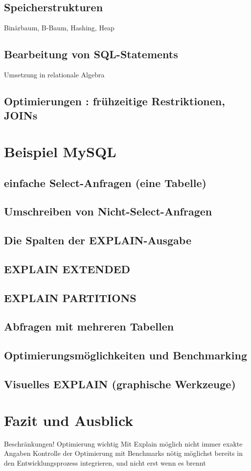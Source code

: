 \subsection{Speicherstrukturen}
 Binärbaum, B-Baum, Hashing, Heap
 
\subsection{Bearbeitung von SQL-Statements}
 Umsetzung in relationale Algebra
 
\subsection{Optimierungen : frühzeitige Restriktionen, JOINs}


\section{Beispiel MySQL}
\subsection{einfache Select-Anfragen (eine Tabelle)}
\subsection{Umschreiben von Nicht-Select-Anfragen}
\subsection{Die Spalten der EXPLAIN-Ausgabe}
\subsection{EXPLAIN EXTENDED}
\subsection{EXPLAIN PARTITIONS}
\subsection{Abfragen mit mehreren Tabellen}
\subsection{Optimierungsmöglichkeiten und Benchmarking}
\subsection{Visuelles EXPLAIN (graphische Werkzeuge)}

\section{Fazit und Ausblick}

Beschränkungen!
Optimierung wichtig
Mit Explain möglich
nicht immer exakte Angaben
Kontrolle der Optimierung mit Benchmarks nötig
möglichst bereits in den Entwicklungsprozess integrieren, und nicht erst wenn es brennt
